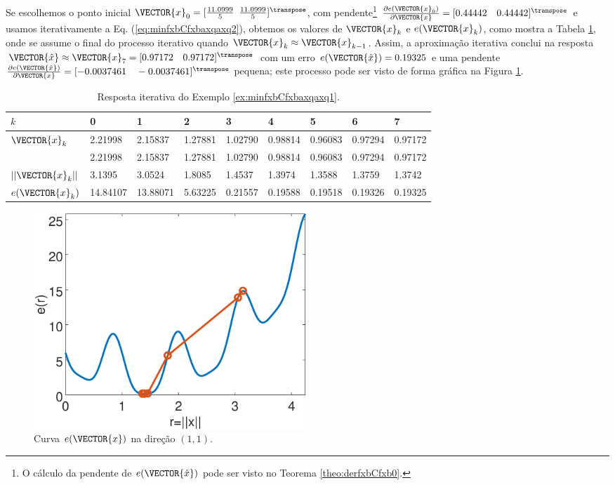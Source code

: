 \begin{SolutionT}
\label{ex:minfxbCfxbaxqaxq3:sol2}
Se escolhemos o ponto inicial $\VECTOR{x}_0=[\frac{11.0999}{5}$ $\frac{11.0999}{5}]^{\transpose}$,
com pendente\footnote{O cálculo da
pendente de $e(\VECTOR{\hat{x}})$ pode ser visto no Teorema \ref{theo:derfxbCfxb0}.} 
$\frac{\partial e(\VECTOR{x}_0)}{\partial \VECTOR{x} }=[0.44442\quad 0.44442]^{\transpose}$ e 
usamos iterativamente a Eq. (\ref{eq:minfxbCfxbaxqaxq2}), obtemos os valores 
de $\VECTOR{x}_k$ e $e(\VECTOR{x}_k)$, como mostra a Tabela \ref{table:ex:minfxbCfxbaxqaxq4},
onde se assume o final do processo iterativo quando $\VECTOR{x}_k \approx \VECTOR{x}_{k-1}$.
Assim, a aproximação iterativa conclui na resposta 
$\VECTOR{\hat{x}}\approx \VECTOR{x}_{7} =[0.97172\quad 0.97172]^{\transpose}$
com um erro $e(\VECTOR{\hat{x}})=0.19325$ e uma pendente
$\frac{\partial e(\VECTOR{\hat{x}})}{\partial \VECTOR{x} }=[-0.0037461\quad -0.0037461]^{\transpose}$
pequena;
este processo pode ser visto de forma gráfica na Figura \ref{fig:ex:minfxbCfxbaxqaxq4:b}.
\end{SolutionT}


\begin{table}[h!]
\centering
\begin{tabular}{|l|l|l|l|l|l|l|l|l|}
\hline
$k$ & 0 & 1 & 2 & 3 & 4 & 5 & 6 & 7\\ \hline
$\VECTOR{x}_k$ & 2.21998 & 2.15837 & 1.27881 & 1.02790 & 0.98814 & 0.96083 & 0.97294 & 0.97172 \\ 
~              & 2.21998 & 2.15837 & 1.27881 & 1.02790 & 0.98814 & 0.96083 & 0.97294 & 0.97172 \\ \hline
$||\VECTOR{x}_k||$ & 3.1395 & 3.0524 & 1.8085 & 1.4537 & 1.3974 & 1.3588 & 1.3759 & 1.3742 \\ \hline
$e(\VECTOR{x}_k)$ & 14.84107 & 13.88071 & 5.63225 & 0.21557 & 0.19588 & 0.19518 & 0.19326 & 0.19325 \\ \hline
\end{tabular}
\caption{Resposta iterativa do Exemplo \ref{ex:minfxbCfxbaxqaxq1}.}
\label{table:ex:minfxbCfxbaxqaxq4}
\end{table}

     \begin{figure}[!h]
         \centering
         \includegraphics[width=0.5\textwidth]{chapters/minimization-fx/mfiles/fxxq3/plotfx4.eps}
         \caption{Curva $e(\VECTOR{x})$ na direção $(1,1)$.}
         \label{fig:ex:minfxbCfxbaxqaxq4:b}
     \end{figure}


